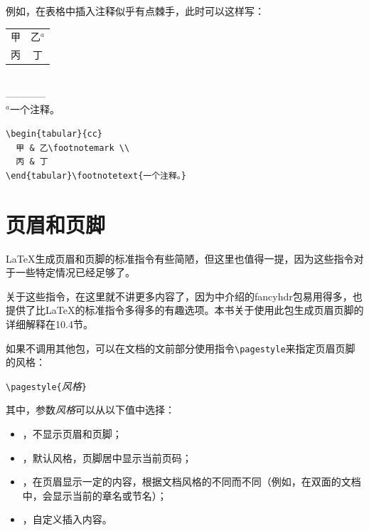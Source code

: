 例如，在表格中插入注释似乎有点棘手，此时可以这样写：

\begin{codelist}[2.19]{
  \begin{tabular}{cc}
    甲 & 乙$^a$ \\
    丙 & 丁\\
  \end{tabular}\\
  ————\\
  {\footnotesize $^a$一个注释。}
}\begin{verbatim}
\begin{tabular}{cc}
  甲 & 乙\footnotemark \\
  丙 & 丁
\end{tabular}\footnotetext{一个注释。}
\end{verbatim}
\end{codelist}

\section{页眉和页脚}

\LaTeX 生成页眉和页脚的标准指令有些简陋，但这里也值得一提，因为这些指令对于一些特定情况已经足够了。

\begin{ii}
关于这些指令，在这里就不讲更多内容了，因为中介绍的fancyhdr包易用得多，也提供了比\LaTeX 的标准指令多得多的有趣选项。本书关于使用此包生成页眉页脚的详细解释在10.4节。
\end{ii}

如果不调用其他包，可以在文档的文前部分使用指令\verb|\pagestyle|来指定页眉页脚的风格：

\begin{dmd}
\verb|\pagestyle{|\textsl{\<风格\>}\verb|}|
\end{dmd}

其中，参数\textsl{\<风格\>}可以从以下值中选择：

\begin{itemize}
  \item {}，不显示页眉和页脚；
  \item {}，默认风格，页脚居中显示当前页码；
  \item {}，在页眉显示一定的内容，根据文档风格的不同而不同（例如，在双面的文档中，会显示当前的章名或节名）；
  \item {}，自定义插入内容。
\end{itemize}

